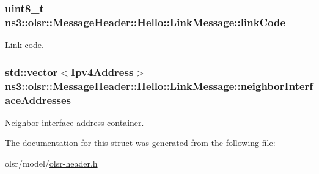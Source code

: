 \subsubsection[{\texorpdfstring{link\+Code}{linkCode}}]{\setlength{\rightskip}{0pt plus 5cm}uint8\+\_\+t ns3\+::olsr\+::\+Message\+Header\+::\+Hello\+::\+Link\+Message\+::link\+Code}\hypertarget{structns3_1_1olsr_1_1MessageHeader_1_1Hello_1_1LinkMessage_ac727c2646a24b15373c760a6e4e3e32a}{}\label{structns3_1_1olsr_1_1MessageHeader_1_1Hello_1_1LinkMessage_ac727c2646a24b15373c760a6e4e3e32a}


Link code. 

\subsubsection[{\texorpdfstring{neighbor\+Interface\+Addresses}{neighborInterfaceAddresses}}]{\setlength{\rightskip}{0pt plus 5cm}std\+::vector$<${\bf Ipv4\+Address}$>$ ns3\+::olsr\+::\+Message\+Header\+::\+Hello\+::\+Link\+Message\+::neighbor\+Interface\+Addresses}\hypertarget{structns3_1_1olsr_1_1MessageHeader_1_1Hello_1_1LinkMessage_aed5e77e4f9eeb0a09abe818be1efe988}{}\label{structns3_1_1olsr_1_1MessageHeader_1_1Hello_1_1LinkMessage_aed5e77e4f9eeb0a09abe818be1efe988}


Neighbor interface address container. 



The documentation for this struct was generated from the following file\+:\begin{DoxyCompactItemize}
\item 
olsr/model/\hyperlink{olsr-header_8h}{olsr-\/header.\+h}\end{DoxyCompactItemize}
